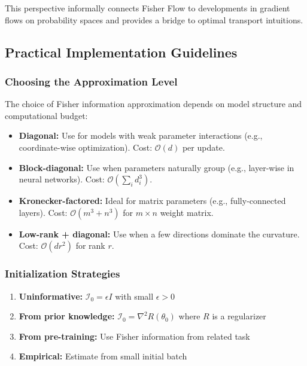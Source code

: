 \documentclass[11pt]{article}
\begin{document}
This perspective informally connects Fisher Flow to developments in gradient flows on probability spaces and provides a bridge to optimal transport intuitions.

\subsection{Practical Implementation Guidelines}

\subsubsection{Choosing the Approximation Level}

The choice of Fisher information approximation depends on model structure and computational budget:

\begin{itemize}
\item \textbf{Diagonal:} Use for models with weak parameter interactions (e.g., coordinate-wise optimization). Cost: $\mathcal{O}(d)$ per update.
\item \textbf{Block-diagonal:} Use when parameters naturally group (e.g., layer-wise in neural networks). Cost: $\mathcal{O}(\sum_i d_i^3)$.
\item \textbf{Kronecker-factored:} Ideal for matrix parameters (e.g., fully-connected layers). Cost: $\mathcal{O}(m^3 + n^3)$ for $m \times n$ weight matrix.
\item \textbf{Low-rank + diagonal:} Use when a few directions dominate the curvature. Cost: $\mathcal{O}(dr^2)$ for rank $r$.
\end{itemize}

\subsubsection{Initialization Strategies}

\begin{enumerate}
\item \textbf{Uninformative:} $\mathcal{I}_0 = \epsilon I$ with small $\epsilon > 0$
\item \textbf{From prior knowledge:} $\mathcal{I}_0 = \nabla^2 R(\theta_0)$ where $R$ is a regularizer
\item \textbf{From pre-training:} Use Fisher information from related task
\item \textbf{Empirical:} Estimate from small initial batch
\end{enumerate}
\end{document}
